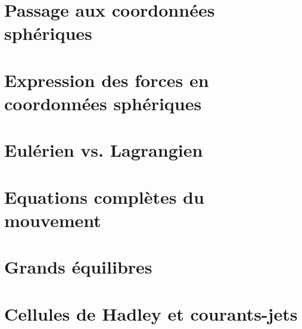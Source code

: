 \documentclass[a4paper,DIV16,10pt]{scrartcl}
\begin{document}
 \inidoc

\newpage \section{Passage aux coordonnées sphériques} 

\newpage \section{Expression des forces en coordonnées sphériques} 

\newpage \section{Eulérien vs. Lagrangien}  \section{Equations complètes du mouvement} 

%
%
%
%	
%
%	

\newpage \section{Grands équilibres} 

\newpage \section{Cellules de Hadley et courants-jets} 
\end{document}
